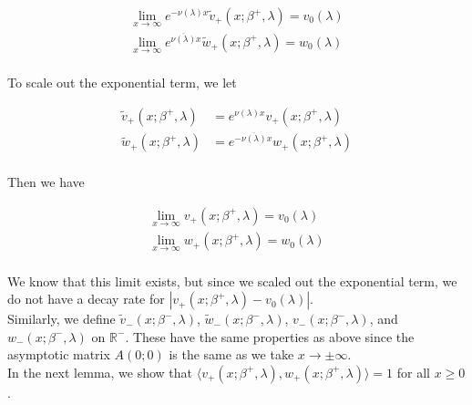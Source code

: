 \documentclass[12pt]{article}
\def\R{{\mathbb R}}
\begin{document}
\begin{align*}
\lim_{x \rightarrow \infty} e^{-\nu(\lambda) x} \tilde{v}_+(x; \beta^+, \lambda) = v_0(\lambda) \\
\lim_{x \rightarrow \infty} e^{\overline{\nu(\lambda)} x} \tilde{w}_+(x; \beta^+, \lambda) = w_0(\lambda) \\
\end{align*}

To scale out the exponential term, we let

\begin{align*}
\tilde{v}_+(x; \beta^+, \lambda) &= e^{\nu(\lambda) x } v_+(x; \beta^+, \lambda) \\
\tilde{w}_+(x; \beta^+, \lambda) &= e^{-\overline{\nu(\lambda)} x } w_+(x; \beta^+, \lambda) \\
\end{align*}

Then we have

\begin{align*}
\lim_{x \rightarrow \infty} v_+(x; \beta^+, \lambda) = v_0(\lambda) \\
\lim_{x \rightarrow \infty} w_+(x; \beta^+, \lambda) = w_0(\lambda) \\
\end{align*}

We know that this limit exists, but since we scaled out the exponential term, we do not have a decay rate for $|v_+(x; \beta^+, \lambda) - v_0(\lambda)|$.\\

Similarly, we define $\tilde{v}_-(x; \beta^-, \lambda)$, $\tilde{w}_-(x; \beta^-, \lambda)$, $v_-(x; \beta^-, \lambda)$, and $w_-(x; \beta^-, \lambda)$ on $\R^-$. These have the same properties as above since the asymptotic matrix $A(0; 0)$ is the same as we take $x \rightarrow \pm \infty$.\\

In the next lemma, we show that $\langle v_+(x; \beta^+, \lambda), w_+(x; \beta^+, \lambda) \rangle = 1$ for all $x \geq 0$.

\end{document}
